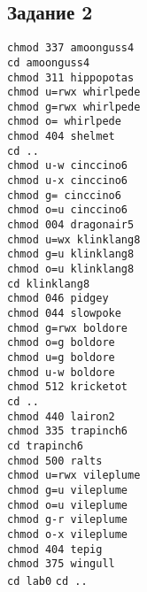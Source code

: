 \subsection*{Задание 2}
\verb|chmod 337 amoonguss4| \\
\verb|cd amoonguss4| \\
\verb|chmod 311 hippopotas| \\
\verb|chmod u=rwx whirlpede| \\
\verb|chmod g=rwx whirlpede| \\
\verb|chmod o= whirlpede| \\
\verb|chmod 404 shelmet| \\
\verb|cd ..| \\
\verb|chmod u-w cinccino6| \\
\verb|chmod u-x cinccino6| \\
\verb|chmod g= cinccino6| \\
\verb|chmod o=u cinccino6| \\
\verb|chmod 004 dragonair5| \\
\verb|chmod u=wx klinklang8| \\
\verb|chmod g=u klinklang8| \\
\verb|chmod o=u klinklang8| \\
\verb|cd klinklang8| \\
\verb|chmod 046 pidgey| \\
\verb|chmod 044 slowpoke| \\
\verb|chmod g=rwx boldore| \\
\verb|chmod o=g boldore| \\
\verb|chmod u=g boldore| \\
\verb|chmod u-w boldore| \\
\verb|chmod 512 kricketot| \\
\verb|cd ..| \\
\verb|chmod 440 lairon2| \\
\verb|chmod 335 trapinch6| \\
\verb|cd trapinch6| \\
\verb|chmod 500 ralts| \\
\verb|chmod u=rwx vileplume| \\
\verb|chmod g=u vileplume| \\ 
\verb|chmod o=u vileplume| \\
\verb|chmod g-r vileplume| \\ 
\verb|chmod o-x vileplume| \\
\verb|chmod 404 tepig| \\
\verb|chmod 375 wingull| \\
\verb|cd lab0|
\verb|cd ..|
